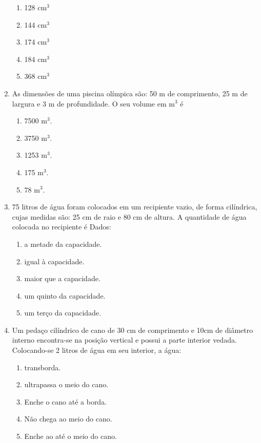 \documentclass[twocolumn,oneside,a4paper,12.0pt]{article}
\begin{document}
\begin{enumerate}
\begin{enumerate}
\item 128 cm$^3$
\item 144 cm$^3$
\item 174 cm$^3$
\item 184 cm$^3$
\item 368 cm$^3$
\end{enumerate}


\item As dimensões de uma piscina olímpica são: 50 m de comprimento, 25 m de largura e 3 m de profundidade. O seu volume em m$^3$ é 

\begin{enumerate}
\item 7500 m$^3$. 
\item 3750 m$^3$. 
\item 1253 m$^3$. 
\item 175 m$^3$. 
\item 78 m$^3$.
\end{enumerate}


\item 75 litros de água foram colocados em um recipiente vazio, de forma cilíndrica, cujas medidas são: 25 cm de raio e 80 cm de altura. A quantidade de água colocada no recipiente é
Dados:

\begin{enumerate}
\item a metade da capacidade.
\item igual à capacidade.
\item maior que a capacidade.
\item um quinto da capacidade.
\item um terço da capacidade.
\end{enumerate}


\item Um pedaço cilíndrico de cano de 30 cm de comprimento e 10cm de diâmetro interno encontra-se na posição vertical e possui a parte interior vedada. Colocando-se 2 litros de água em seu interior, a água:

\begin{enumerate}
\item transborda.
\item ultrapassa o meio do cano.
\item Enche o cano até a borda.
\item Não chega ao meio do cano. 
\item Enche ao até o meio do cano. 
\end{enumerate}


\end{enumerate}
\end{document}
